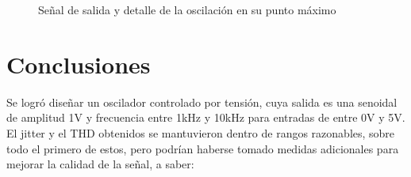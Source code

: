\documentclass[../../tc_tp6_main.tex]{subfiles}
\begin{document}
\begin{figure}[H]
	\centering
\end{figure}
\begin{figure}[H]
	\centering
	\caption{Se\~nal de salida y detalle de la oscilaci\'on en su punto m\'aximo}
	\label{fig:senoidal}
\end{figure}

\newpage
\section{Conclusiones}

Se logr\'o dise\~nar un oscilador controlado por tensi\'on, cuya salida es una senoidal de amplitud 1V y frecuencia entre 1kHz y 10kHz para entradas de entre 0V y 5V. El jitter y el THD obtenidos se mantuvieron dentro de rangos razonables, sobre todo el primero de estos, pero podr\'ian haberse tomado medidas adicionales para mejorar la calidad de la se\~nal, a saber:
\end{document}
